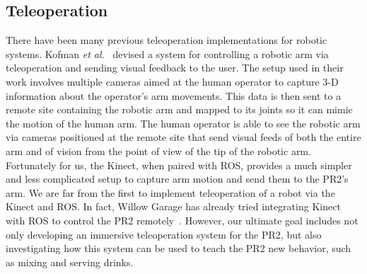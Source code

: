 \documentclass{sig-alternate}
\begin{document}
\subsection{Teleoperation}
\indent There have been many previous teleoperation implementations for robotic systems. Kofman \textit{et al.}~\cite{robot_interface} devised a system for controlling a robotic arm via teleoperation and sending visual feedback to the user. The setup used in their work involves multiple cameras aimed at the human operator to capture 3-D information about the operator's arm movements. This data is then sent to a remote site containing the robotic arm and mapped to its joints so it can mimic the motion of the human arm. The human operator is able to see the robotic arm via cameras positioned at the remote site that send visual feeds of both the entire arm and of vision from the point of view of the tip of the robotic arm. Fortunately for us, the Kinect, when paired with ROS, provides a much simpler and less complicated setup to capture arm motion and send them to the PR2's arm. We are far from the first to implement teleoperation of a robot via the Kinect and ROS. In fact, Willow Garage has already tried integrating Kinect with ROS to control the PR2 remotely~\cite{willow_kinect}. However, our ultimate goal includes not only developing an immersive teleoperation system for the PR2, but also investigating how this system can be used to teach the PR2 new behavior, such as mixing and serving drinks.
\end{document}
